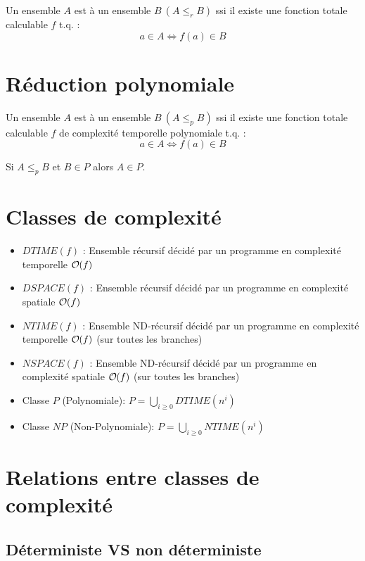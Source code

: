Un ensemble $A$ est  à un ensemble $B \ (A \leq_r B)$ ssi il existe une fonction totale calculable $f$ t.q. :
\begin{equation*}
a \in A \Leftrightarrow f(a) \in B
\end{equation*}

\section{Réduction polynomiale}

Un ensemble $A$ est  à un ensemble $B \ (A \leq_p B)$ ssi il existe une fonction totale calculable $f$ de complexité temporelle polynomiale t.q. :
\begin{equation*}
a \in A \Leftrightarrow f(a) \in B
\end{equation*}

Si $A \leq_p B$ et $B \in P$ alors $A \in P$.

\section{Classes de complexité}

\begin{itemize}
\item $DTIME(f)$ : Ensemble récursif décidé par un programme en complexité temporelle $\bigO(f)$
\item $DSPACE(f)$ : Ensemble récursif décidé par un programme en complexité spatiale $\bigO(f)$
\item $NTIME(f)$ : Ensemble ND-récursif décidé par un programme en complexité temporelle $\bigO(f)$ (sur toutes les branches)
\item $NSPACE(f)$ : Ensemble ND-récursif décidé par un programme en complexité spatiale $\bigO(f)$ (sur toutes les branches)
\item Classe $P$ (Polynomiale): $P = \underset{i \geq 0}{\bigcup} DTIME(n^i)$
\item Classe $NP$ (Non-Polynomiale): $P = \underset{i \geq 0}{\bigcup} NTIME(n^i)$
\end{itemize}

\section{Relations entre classes de complexité}

\subsection{Déterministe VS non déterministe}

